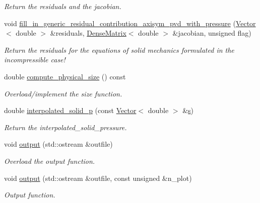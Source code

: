 \begin{DoxyCompactItemize}
\begin{DoxyCompactList}\small\item\em Return the residuals and the jacobian. \end{DoxyCompactList}\item 
void \hyperlink{classoomph_1_1AxisymmetricPVDEquationsWithPressure_a38ed51aff165e6a9708664a251fe291b}{fill\+\_\+in\+\_\+generic\+\_\+residual\+\_\+contribution\+\_\+axisym\+\_\+pvd\+\_\+with\+\_\+pressure} (\hyperlink{classoomph_1_1Vector}{Vector}$<$ double $>$ \&residuals, \hyperlink{classoomph_1_1DenseMatrix}{Dense\+Matrix}$<$ double $>$ \&jacobian, unsigned flag)
\begin{DoxyCompactList}\small\item\em Return the residuals for the equations of solid mechanics formulated in the incompressible case! \end{DoxyCompactList}\item 
double \hyperlink{classoomph_1_1AxisymmetricPVDEquationsWithPressure_a975e38ffef201b3c8bd36e7ff6206eb9}{compute\+\_\+physical\+\_\+size} () const
\begin{DoxyCompactList}\small\item\em Overload/implement the size function. \end{DoxyCompactList}\item 
double \hyperlink{classoomph_1_1AxisymmetricPVDEquationsWithPressure_adfd0277b2f05d4689fd7b4c6707929ab}{interpolated\+\_\+solid\+\_\+p} (const \hyperlink{classoomph_1_1Vector}{Vector}$<$ double $>$ \&\hyperlink{cfortran_8h_ab7123126e4885ef647dd9c6e3807a21c}{s})
\begin{DoxyCompactList}\small\item\em Return the interpolated\+\_\+solid\+\_\+pressure. \end{DoxyCompactList}\item 
void \hyperlink{classoomph_1_1AxisymmetricPVDEquationsWithPressure_aba49f4147fb78fa74cd591b4a77eab98}{output} (std\+::ostream \&outfile)
\begin{DoxyCompactList}\small\item\em Overload the output function. \end{DoxyCompactList}\item 
void \hyperlink{classoomph_1_1AxisymmetricPVDEquationsWithPressure_a6916b3f7784015c263556565b2a7219d}{output} (std\+::ostream \&outfile, const unsigned \&n\+\_\+plot)
\begin{DoxyCompactList}\small\item\em Output function. \end{DoxyCompactList}\item 

\end{DoxyCompactItemize}
